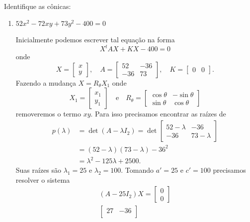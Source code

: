 \begin{exemplos}
  Identifique as c\^onicas:
  \begin{enumerate}
    \item $52x^2 - 72xy + 73y^2 - 400 = 0$
    \begin{solucao}
      Inicialmente podemos escrever tal equação na forma
      \[
        X^t A X + KX - 400 = 0
      \]
      onde
      \[
        X = \begin{bmatrix}
          x\\y
        \end{bmatrix}, \quad A = \begin{bmatrix}
          52 & -36\\
          -36 & 73
        \end{bmatrix},\quad K = \begin{bmatrix}
          0 & 0
        \end{bmatrix}.
      \]
      Fazendo a mudança $X = R_\theta X_1$ onde
      \[
        X_1 = \begin{bmatrix}
          x_1 \\y_1
        \end{bmatrix} \quad\mbox{e}\quad R_\theta = \begin{bmatrix}
          \cos\theta & -\sin\theta\\
          \sin\theta & \cos\theta
        \end{bmatrix}
      \]
      removeremos o termo $xy$. Para isso precisamos encontrar as raízes de
      \begin{align*}
        p(\lambda) &= \det (A - \lambda I_2) = \det \begin{bmatrix}
          52 - \lambda & -36\\
          -36 & 73 - \lambda
        \end{bmatrix} \\ &= (52 - \lambda)(73 - \lambda) - 36^2 \\ &= \lambda^2 - 125\lambda + 2500.
      \end{align*}
      Suas raízes são $\lambda_1 = 25$ e $\lambda_2 = 100$. Tomando $a' = 25$ e $c' = 100$ precisamos resolver o sistema
      \begin{align*}
        (A - 25I_2)X = \begin{bmatrix}
          0\\0
        \end{bmatrix}\\
        \begin{bmatrix}
          27 & -36\\

\end{bmatrix}
\end{align*}
\end{solucao}
\end{enumerate}
\end{exemplos}
